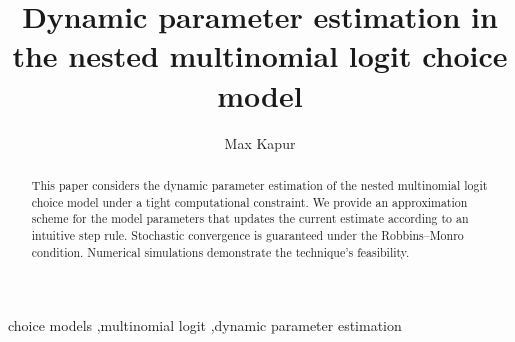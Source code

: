\documentclass[preprint,12pt,authoryear]{elsarticle}
\begin{document}
\begin{frontmatter}


 \title{Dynamic parameter estimation in the nested multinomial logit choice model}
 \author{Max Kapur}
 \address{Seoul National University, Department of Industrial Engineering, 1 Gwanak-ro, Gwanak-gu, Seoul 08826, Republic of Korea}

\begin{abstract}
This paper considers the dynamic parameter estimation of the nested multinomial logit choice model under a tight computational constraint. We provide an approximation scheme for the model parameters that updates the current estimate according to an intuitive step rule. Stochastic convergence is guaranteed under the Robbins--Monro condition. Numerical simulations demonstrate the technique's feasibility.
\end{abstract}



\begin{keyword}
choice models \sep multinomial logit \sep dynamic parameter estimation



\end{keyword}

\end{frontmatter}
\end{document}
